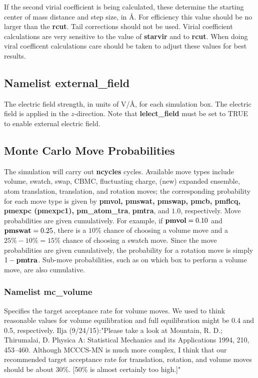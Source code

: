 \documentclass[12pt,letterpaper]{article}
\begin{document}
 If the second virial
coefficient is being calculated, these determine the
starting center of mass distance and step size, in {\AA}.
For efficiency this value should be no larger than the 
{\bf rcut}. Tail corrections should not be used. Virial
coefficient calculations are very sensitive to the value
of {\bf starvir} and to {\bf rcut}. When doing viral 
coefficent calculations care should be taken to adjust
these values for best results. 

\subsection{Namelist \textbf{external\_field}}
 The electric field strength, in
units of V/\AA, for each simulation box. The electric field
is applied in the $z$-direction. Note that {\bf
  lelect\_field} must be set to TRUE to enable external
electric field.

\subsection{Monte Carlo Move Probabilities}
The simulation will carry out {\bf ncycles} cycles.
Available move types include volume, swatch, swap, CBMC,
fluctuating charge, (new) expanded ensemble, atom
translation, translation, and rotation moves; the
corresponding probability for each move type is given by
{\bf pmvol, pmswat, pmswap, pmcb, pmflcq, pmexpc (pmexpc1),
  pm\_atom\_tra}, {\bf pmtra}, and $1.0$, respectively. Move
probabilities are given cumulatively. For example, if ${\bf
  pmvol} = 0.10$ and ${\bf pmswat} = 0.25$, there is a
$10\%$ chance of choosing a volume move and a $25\%-10\% =
15\%$ chance of choosing a swatch move. Since the move
probabilities are given cumulatively, the probability for a
rotation move is simply $1 - {\bf pmtra}$. Sub-move
probabilities, such as on which box to perform a volume
move, are also cumulative.

\subsubsection{Namelist \textbf{mc\_volume}}
 Specifies the target acceptance rate
for volume moves. We used to think reasonable values for volume equilibration
and full equilibration might be 0.4 and 0.5, respectively.
Ilja (9/24/15):"Please take a look at 
Mountain, R. D.; Thirumalai, D. Physica A: Statistical Mechanics and its Applications
1994, 210, 453--460.
Although MCCCS-MN is much more complex, I think that our
recommended target acceptance rate for translation, rotation,
and volume moves should be about 30\%.  [50\% is almost certainly too high.]"
\end{document}
